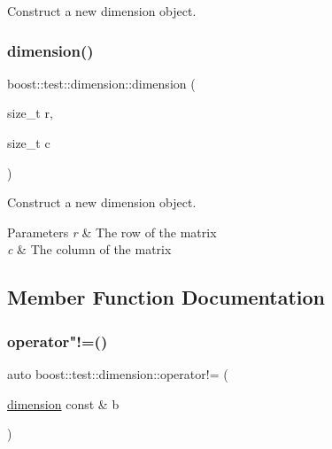 Construct a new dimension object. 

\mbox{\label{structboost_1_1test_1_1dimension_a550aa7f36f42fb470ccffd6c8c11dabb}} 
\subsubsection{\texorpdfstring{dimension()}{dimension()}\hspace{0.1cm}{\footnotesize\ttfamily [2/2]}}
{\footnotesize\ttfamily boost\+::test\+::dimension\+::dimension (\begin{DoxyParamCaption}\item[{size\+\_\+t}]{r,  }\item[{size\+\_\+t}]{c }\end{DoxyParamCaption})\hspace{0.3cm}{\ttfamily [inline]}}



Construct a new dimension object. 


\begin{DoxyParams}{Parameters}
{\em r} & The row of the matrix \\
\hline
{\em c} & The column of the matrix \\
\hline
\end{DoxyParams}


\subsection{Member Function Documentation}
\mbox{\label{structboost_1_1test_1_1dimension_ac1ffbf35ade4a10609b393c62dd5a8c2}} 
\subsubsection{\texorpdfstring{operator"!=()}{operator!=()}}
{\footnotesize\ttfamily auto boost\+::test\+::dimension\+::operator!= (\begin{DoxyParamCaption}\item[{\mbox{\hyperlink{structboost_1_1test_1_1dimension}{dimension}} const \&}]{b }\end{DoxyParamCaption})\hspace{0.3cm}{\ttfamily [inline]}}



